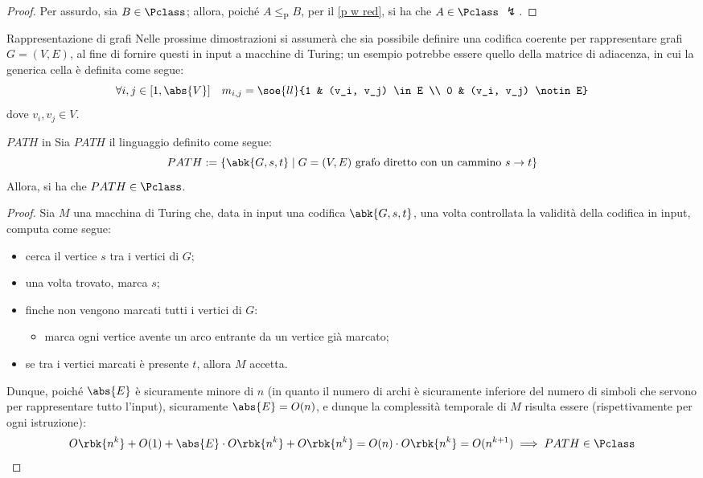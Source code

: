 \documentclass[a4paper, 12pt]{report}
\begin{document}
    \begin{proof}
        Per assurdo, sia $B \in \Pclass$; allora, poiché $A \leq_\mathrm P B$, per il \cref{p w red}, si ha che $A \in \Pclass$ $\lightning$.
    \end{proof}

    \begin{framedobs}{Rappresentazione di grafi}
        Nelle prossime dimostrazioni si assumerà che sia possibile definire una codifica coerente per rappresentare grafi $G = (V, E)$, al fine di fornire questi in input a macchine di Turing; un esempio potrebbe essere quello della matrice di adiacenza, in cui la generica cella è definita come segue: $$\forall i, j \in [1, \abs{V}] \quad m_{i, j} = \soe{ll}{1 & (v_i, v_j) \in E \\ 0 & (v_i, v_j) \notin E}$$ dove $v_i, v_j\in V$.
    \end{framedobs}

    \begin{framedthm}[label={path in p}]{$PATH$ in \Pclass}
        Sia $PATH$ il linguaggio definito come segue: $$PATH := \{\abk{G, s, t} \mid G = (V, E) \ \textrm{grafo diretto con un cammino $s \to t$}\}$$ Allora, si ha che $PATH \in \Pclass$.
    \end{framedthm}

    \begin{proof}
        Sia $M$ una macchina di Turing che, data in input una codifica $\abk{G, s, t}$, una volta controllata la validità della codifica in input, computa come segue:

        \begin{itemize}
            \item cerca il vertice $s$ tra i vertici di $G$;
            \item una volta trovato, marca $s$;
            \item finche non vengono marcati tutti i vertici di $G$:

                \begin{itemize}
                    \item marca ogni vertice avente un arco entrante da un vertice già marcato;
                \end{itemize}
            \item se tra i vertici marcati è presente $t$, allora $M$ accetta.
        \end{itemize}

        Dunque, poiché $\abs{E}$ è sicuramente minore di $n$ (in quanto il numero di archi è sicuramente inferiore del numero di simboli che servono per rappresentare tutto l'input), sicuramente $\abs{E} = O(n)$, e dunque la complessità temporale di $M$ risulta essere (rispettivamente per ogni istruzione): $$O\rbk{n^k} + O(1) + \abs{E} \cdot O\rbk{n^k} + O\rbk{n^k} = O(n) \cdot O\rbk{n^k} = O(n^{k + 1}) \implies PATH \in \Pclass$$
    \end{proof}
\end{document}

